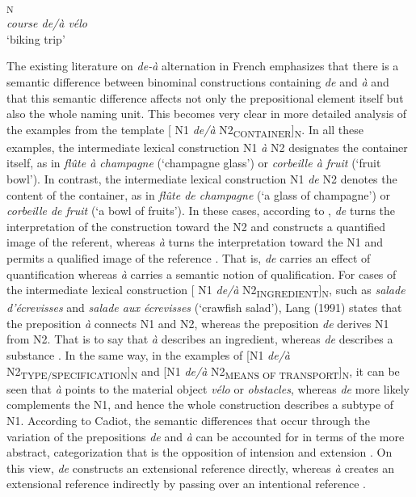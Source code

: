 \documentclass[output=paper]{langsci/langscibook}
\begin{document}
\ea{}\textsubscript{N}\\
\textit{course de/à vélo}\\
`biking trip'
\z

The existing literature on \textit{de-à} alternation in French emphasizes that there is a semantic difference between binominal constructions containing \textit{de} and \textit{à} and that this semantic difference affects not only the prepositional element itself but also the whole naming unit. This becomes very clear in more detailed analysis of the examples from the template [ N1 \textit{de/à} N2\textsubscript{CONTAINER}]\textsubscript{N}. In all these examples, the intermediate lexical construction N1 \textit{à} N2 designates the container itself, as in \textit{flûte à champagne} (`champagne glass') or \textit{corbeille à fruit} (`fruit bowl'). In contrast, the intermediate lexical construction N1 \textit{de} N2 denotes the content of the container, as in \textit{flûte de champagne} (`a glass of champagne') or \textit{corbeille de fruit} (`a bowl of fruits'). In these cases, according to \citet{Cadiot:1997}, \textit{de} turns the interpretation of the construction toward the N2 and constructs a quantified image of the referent, whereas \textit{à} turns the interpretation toward the N1 and permits a qualified image of the reference \citep[44]{Cadiot:1997}. That is, \textit{de} carries an effect of quantification whereas \textit{à} carries a semantic notion of qualification. For cases of the intermediate lexical construction [ N1 \textit{de/à} N2\textsubscript{INGREDIENT}]\textsubscript{N}, such as \textit{salade d’écrevisses} and \textit{salade aux écrevisses} (`crawfish salad'), Lang (1991) states that the preposition \textit{à} connects N1 and N2, whereas the preposition \textit{de} derives N1 from N2. That is to say that \textit{à} describes an ingredient, whereas \textit{de} describes a substance \citep[283]{Lang:1991}. In the same way, in the examples of [N1 \textit{de/à} N2\textsubscript{TYPE/SPECIFICATION}]\textsubscript{N} and [N1 \textit{de/à} N2\textsubscript{MEANS OF TRANSPORT}]\textsubscript{N}, it can be seen that \textit{à} points to the material object \textit{vélo} or \textit{obstacles}, whereas  \textit{de} more likely complements the N1, and hence the whole construction describes a subtype of N1. According to Cadiot, the semantic differences that occur through the variation of the prepositions \textit{de} and \textit{à} can be accounted for in terms of the more abstract, categorization that is the opposition of intension and extension \citep[43]{Cadiot:1997}. On this view, \textit{de} constructs an extensional reference  directly, whereas \textit{à} creates an extensional reference  indirectly by passing over an intentional reference \citep[62]{Cadiot:1997}. 
\end{document}
